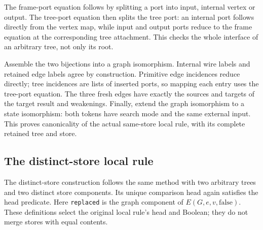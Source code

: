 


The frame-port equation follows by splitting a port into input, internal
vertex or output. The tree-port equation then splits the tree port: an
internal port follows directly from the vertex map, while input and output
ports reduce to the frame equation at the corresponding tree attachment.
This checks the whole interface of an arbitrary tree, not only its root.



Assemble the two bijections into a graph isomorphism. Internal wire labels
and retained edge labels agree by construction. Primitive edge incidences
reduce directly; tree incidences are lists of inserted ports, so mapping each
entry uses the tree-port equation. The three fresh edges have exactly the
sources and targets of the target result and weakenings. Finally, extend the
graph isomorphism to a state isomorphism: both tokens have search mode and
the same external input. This proves canonicality of the actual same-store
local rule, with its complete retained tree and store.



\subsection{The distinct-store local rule}

The distinct-store construction follows the same method with two arbitrary
trees and two distinct store components. Its unique comparison head again
satisfies the head predicate. Here \texttt{replaced} is the graph component
of $E(G,e,v,\mathrm{false})$. These definitions select the original local
rule's head and Boolean; they do not merge stores with equal contents.


